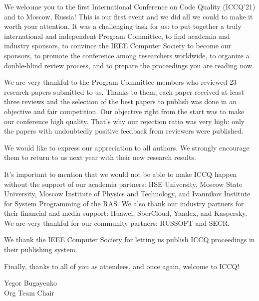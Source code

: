 \clearpage
{}

We welcome you to the first International Conference on Code Quality (ICCQ'21)
and to Moscow, Russia! This is our first event and we did all we could to make
it worth your attention. It was a challenging task for us:
to put together a truly international and independent Program Committee,
to find academia and industry sponsors,
to convince the IEEE Computer Society to become our sponsors,
to promote the conference among researchers worldwide,
to organize a double-blind review process,
and to prepare the proceedings you are reading now.

We are very thankful to the Program Committee members who
reviewed 23 research papers submitted to us. Thanks to them,
each paper received at least three reviews and the selection of the best papers to publish
was done in an objective and fair competition. Our objective right
from the start was to make our conference high quality.
That's why our rejection ratio was very high: only the
papers with undoubtedly positive feedback from reviewers were published.

We would like to express our appreciation to all authors.
We strongly encourage them to return to us next year
with their new research results.

It's important to mention that we would not be able to make
ICCQ happen without the support of our academia partners:
HSE University,
Moscow State University,
Moscow Institute of Physics and Technology,
and Ivannikov Institute for System Programming of the RAS.
We also thank our industry partners for their financial and media support:
Huawei, SberCloud, Yandex, and Kaspersky.
We are very thankful for our community partners: RUSSOFT and SECR.

We thank the IEEE Computer Society for letting us publish ICCQ proceedings
in their publishing system.

Finally, thanks to all of you as attendees, and once again, welcome to ICCQ!

Yegor Bugayenko\\
Org Team Chair
